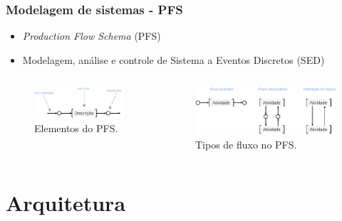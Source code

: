 \documentclass[10pt]{beamer}
\begin{document}
\begin{frame}
	\frametitle{Modelagem de sistemas - PFS} 
	
	\begin{itemize}
		\item \textit{Production Flow Schema} (PFS)
		\item Modelagem, análise e controle de Sistema a Eventos Discretos (SED)
	\end{itemize}

	\begin{columns}[c] %
		\begin{figure}[htb]
			\centering
			\caption{Elementos do PFS.}
			\label{fig:pfs-elementos}
			\includegraphics[width=1\textwidth]{pfs-elementos}
		\end{figure}
		
		\begin{figure}[htb]
			\centering
			\caption{Tipos de fluxo no PFS.}
			\label{fig:pfs-fluxos}
			\includegraphics[width=1\textwidth]{pfs-fluxos}
		\end{figure}
		
	\end{columns}
	
\end{frame}
\fi

\section{Arquitetura}
\end{document}
